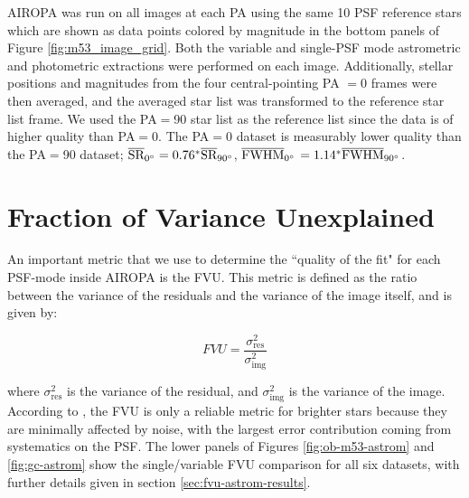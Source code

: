 \documentclass[]{spie}  %
\begin{document}
AIROPA was run on all images at each PA using the same 10 PSF reference stars which are shown as data points colored by magnitude in the bottom panels of Figure \ref{fig:m53_image_grid}. Both the variable and single-PSF mode astrometric and photometric extractions were performed on each image. Additionally, stellar positions and magnitudes from the four central-pointing PA $=0$ frames were then averaged, and the averaged star list was transformed to the reference star list frame. We used the PA$=$90 star list as the reference list since the data is of higher quality than PA$=$0. The PA$=$0 dataset is measurably lower quality than the PA$=$90 dataset; $\overline{\textrm{SR}}_{0\degree} = 0.76^{*}\overline{\textrm{SR}}_{90\degree}$, $\overline{\textrm{FWHM}}_{0\degree}$ $= 1.14^{*}\overline{\textrm{FWHM}}_{90\degree}$.


\section{Fraction of Variance Unexplained} \label{sec:fvu}
An important metric that we use to determine the ``quality of the fit" for each PSF-mode inside AIROPA is the FVU. This metric is defined as the ratio between the variance of the residuals and the variance of the image itself, and is given by:

\begin{equation}
    FVU = \frac{\sigma^{2}_{\textrm{res}}}{\sigma^{2}_{\textrm{img}}}
\end{equation}

\noindent where $\sigma^{2}_{\textrm{res}}$ is the variance of the residual, and $\sigma^{2}_{\textrm{img}}$ is the variance of the image. According to \cite{Turri:inprep}, the FVU is only a reliable metric for brighter stars because they are minimally affected by noise, with the largest error contribution coming from systematics on the PSF. The lower panels of Figures \ref{fig:ob-m53-astrom} and \ref{fig:gc-astrom} show the single/variable FVU comparison for all six datasets, with further details given in section \ref{sec:fvu-astrom-results}. 
\end{document}
